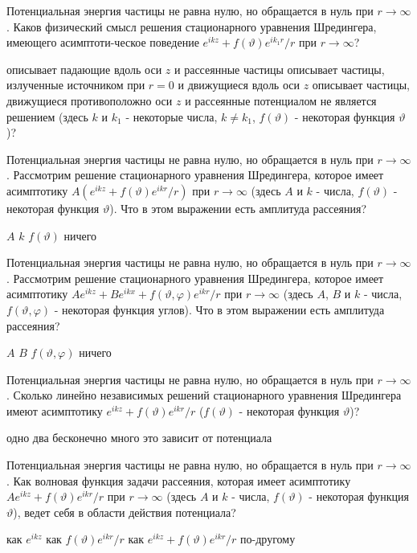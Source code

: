 \documentclass[11pt,a4paper]{exam}
\begin{document}
\begin{questions}
\question Потенциальная энергия частицы не равна нулю, но обращается в нуль при $r \to \infty $. Каков физический смысл решения стационарного уравнения Шредингера, имеющего асимптоти-ческое поведение ${e^{ikz}} + f(\vartheta ){e^{i{k_1}r}}/r$ при $r \to \infty $?
\begin{choices}
\choice описывает падающие вдоль оси $z$ и рассеянные частицы
\choice описывает частицы, излученные источником при $r = 0$ и движущиеся вдоль оси $z$
\choice описывает частицы, движущиеся противоположно оси $z$ и рассеянные потенциалом
\choice не является решением
(здесь $k$ и ${k_1}$ - некоторые числа, $k \ne {k_1}$, $f(\vartheta )$ - некоторая функция $\vartheta $)?
\end{choices}

\question Потенциальная энергия частицы не равна нулю, но обращается в нуль при $r \to \infty $. Рассмотрим решение стационарного уравнения Шредингера, которое имеет асимптотику $A({e^{ikz}} + f(\vartheta ){e^{ikr}}/r)$ при $r \to \infty $ (здесь $A$ и $k$ - числа, $f(\vartheta )$ - некоторая функция $\vartheta $). Что в этом выражении есть амплитуда рассеяния?
\begin{choices}
\choice $A$      
\choice $k$      
\choice $f(\vartheta )$   
\choice ничего 
\end{choices}

\question Потенциальная энергия частицы не равна нулю, но обращается в нуль при $r \to \infty $. Рассмотрим решение стационарного уравнения Шредингера, которое имеет асимптотику $A{e^{ikz}} + B{e^{ikx}} + f(\vartheta ,\varphi ){e^{ikr}}/r$ при $r \to \infty $ (здесь $A$, $B$ и $k$ - числа, $f(\vartheta ,\varphi )$ - некоторая функция углов). Что в этом выражении есть амплитуда рассеяния?
\begin{choices}
\choice $A$      
\choice $B$      
\choice $f(\vartheta ,\varphi )$   
\choice ничего 
\end{choices}

\question Потенциальная энергия частицы не равна нулю, но обращается в нуль при $r \to \infty $. Сколько линейно независимых решений стационарного уравнения Шредингера имеют асимптотику ${e^{ikz}} + f(\vartheta ){e^{ikr}}/r$ ($f(\vartheta )$ - некоторая функция $\vartheta $)?
\begin{choices}
\choice одно  
\choice два      
\choice бесконечно много     
\choice это зависит от потенциала
\end{choices}

\question Потенциальная энергия частицы не равна нулю, но обращается в нуль при $r \to \infty $. Как волновая функция задачи рассеяния, которая имеет асимптотику $A{e^{ikz}} + f(\vartheta ){e^{ikr}}/r$ при $r \to \infty $ (здесь $A$ и $k$ - числа, $f(\vartheta )$ - некоторая функция $\vartheta $), ведет себя в области действия потенциала?
\begin{choices}
\choice как ${e^{ikz}}$
\choice как $f(\vartheta ){e^{ikr}}/r$
\choice как ${e^{ikz}} + f(\vartheta ){e^{ikr}}/r$
\choice по-другому
\end{choices}


\end{questions}
\end{document}
